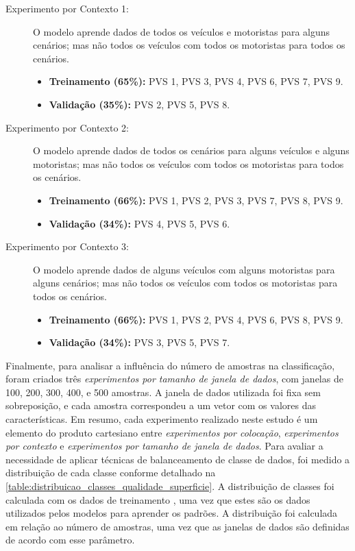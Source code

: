 \begin{description}
	
	\item[Experimento por Contexto 1:] O modelo aprende dados de todos os veículos e motoristas para alguns cenários; mas não todos os veículos com todos os motoristas para todos os cenários.
    \begin{itemize}
        \item \textbf{Treinamento (65\%):} PVS 1, PVS 3, PVS 4, PVS 6, PVS 7, PVS 9. 
        \item \textbf{Validação (35\%):} PVS 2, PVS 5, PVS 8.
    \end{itemize}
    
    \item[Experimento por Contexto 2:] O modelo aprende dados de todos os cenários para alguns veículos e alguns motoristas; mas não todos os veículos com todos os motoristas para todos os cenários.
    \begin{itemize}
        \item \textbf{Treinamento (66\%):} PVS 1, PVS 2, PVS 3, PVS 7, PVS 8, PVS 9.
        \item \textbf{Validação (34\%):} PVS 4, PVS 5, PVS 6.
    \end{itemize}
    
    \item[Experimento por Contexto 3:] O modelo aprende dados de alguns veículos com alguns motoristas para alguns cenários; mas não todos os veículos com todos os motoristas para todos os cenários.
    \begin{itemize}
        \item \textbf{Treinamento (66\%):} PVS 1, PVS 2, PVS 4, PVS 6, PVS 8, PVS 9.
        \item \textbf{Validação (34\%):} PVS 3, PVS 5, PVS 7.
    \end{itemize}
    
\end{description}

Finalmente, para analisar a influência do número de amostras na classificação, foram criados três \emph{experimentos por tamanho de janela de dados}, com janelas de 100, 200, 300, 400, e 500 amostras. A janela de dados utilizada foi fixa sem sobreposição, e cada amostra correspondeu a um vetor com os valores das características. Em resumo, cada experimento realizado neste estudo é um elemento do produto cartesiano entre \emph{experimentos por colocação}, \emph{experimentos por contexto} e \emph{experimentos por tamanho de janela de dados}. Para avaliar a necessidade de aplicar técnicas de balanceamento de classe de dados, foi medido a distribuição de cada classe conforme detalhado na \autoref{table:distribuicao_classes_qualidade_superficie}. A distribuição de classes foi calculada com os dados de treinamento \cite{He2013,Kuhn2013}, uma vez que estes são os dados utilizados pelos modelos para aprender os padrões. A distribuição foi calculada em relação ao número de amostras, uma vez que as janelas de dados são definidas de acordo com esse parâmetro.

